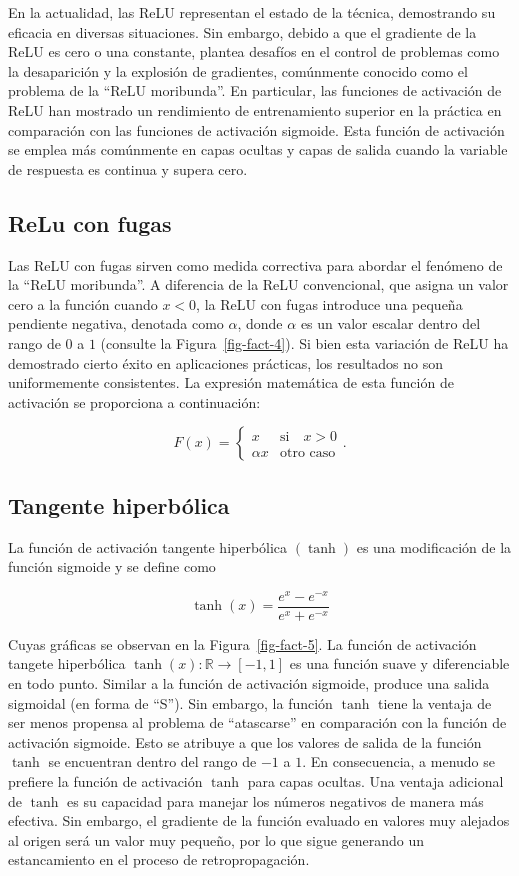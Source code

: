 \documentclass[
  us-letterpaper,
]{scrreprt}
\theoremstyle{definition}
\theoremstyle{plain}
\theoremstyle{plain}
\theoremstyle{definition}
\theoremstyle{remark}
\begin{document}
En la actualidad, las ReLU representan el estado de la técnica,
demostrando su eficacia en diversas situaciones. Sin embargo, debido a
que el gradiente de la ReLU es cero o una constante, plantea desafíos en
el control de problemas como la desaparición y la explosión de
gradientes, comúnmente conocido como el problema de la ``ReLU
moribunda''. En particular, las funciones de activación de ReLU han
mostrado un rendimiento de entrenamiento superior en la práctica en
comparación con las funciones de activación sigmoide. Esta función de
activación se emplea más comúnmente en capas ocultas y capas de salida
cuando la variable de respuesta es continua y supera cero.

\subsection{ReLu con fugas}\label{relu-con-fugas}

Las ReLU con fugas sirven como medida correctiva para abordar el
fenómeno de la ``ReLU moribunda''. A diferencia de la ReLU convencional,
que asigna un valor cero a la función cuando \(x < 0\), la ReLU con
fugas introduce una pequeña pendiente negativa, denotada como
\(\alpha\), donde \(\alpha\) es un valor escalar dentro del rango de
\(0\) a \(1\) (consulte la Figura~\ref{fig-fact-4}). Si bien esta
variación de ReLU ha demostrado cierto éxito en aplicaciones prácticas,
los resultados no son uniformemente consistentes. La expresión
matemática de esta función de activación se proporciona a continuación:

\[
F(x)=\begin{cases}x & \text{si}\quad x>0\\ \alpha x& \text{otro caso}\end{cases}.
\]

\subsection{Tangente hiperbólica}\label{tangente-hiperbuxf3lica}

La función de activación tangente hiperbólica \((\tanh)\) es una
modificación de la función sigmoide y se define como

\[
\tanh(x)=\frac{e^x-e^{-x}}{e^{x}+e^{-x}}
\]

Cuyas gráficas se observan en la Figura~\ref{fig-fact-5}. La función de
activación tangete hiperbólica \(\tanh(x):\mathbb R\to [-1,1]\) es una
función suave y diferenciable en todo punto. Similar a la función de
activación sigmoide, produce una salida sigmoidal (en forma de ``S'').
Sin embargo, la función \(\tanh\) tiene la ventaja de ser menos propensa
al problema de ``atascarse'' en comparación con la función de activación
sigmoide. Esto se atribuye a que los valores de salida de la función
\(\tanh\) se encuentran dentro del rango de \(-1\) a \(1\). En
consecuencia, a menudo se prefiere la función de activación \(\tanh\)
para capas ocultas. Una ventaja adicional de \(\tanh\) es su capacidad
para manejar los números negativos de manera más efectiva. Sin embargo,
el gradiente de la función evaluado en valores muy alejados al origen
será un valor muy pequeño, por lo que sigue generando un estancamiento
en el proceso de retropropagación.
\end{document}
